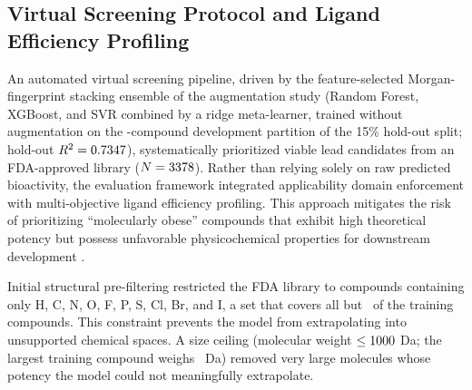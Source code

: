 \subsection{Virtual Screening Protocol and Ligand Efficiency Profiling}

An automated virtual screening pipeline, driven by the feature-selected Morgan-fingerprint stacking ensemble of the augmentation study (Random Forest, XGBoost, and SVR combined by a ridge meta-learner, trained without augmentation on the \ExpNDev-compound development partition of the 15\% hold-out split; hold-out $R^2 = 0.7347$), systematically prioritized viable lead candidates from an FDA-approved library ($N = 3378$). Rather than relying solely on raw predicted bioactivity, the evaluation framework integrated applicability domain enforcement with multi-objective ligand efficiency profiling. This approach mitigates the risk of prioritizing ``molecularly obese'' compounds that exhibit high theoretical potency but possess unfavorable physicochemical properties for downstream development \cite{hopkins2004}.

Initial structural pre-filtering restricted the FDA library to compounds containing only H, C, N, O, F, P, S, Cl, Br, and I, a set that covers all but \ScreenTrainNOutsideElements\ of the training compounds. This constraint prevents the model from extrapolating into unsupported chemical spaces. A size ceiling (molecular weight $\le 1000$ Da; the largest training compound weighs \ScreenTrainMaxMW\ Da) removed very large molecules whose potency the model could not meaningfully extrapolate.


